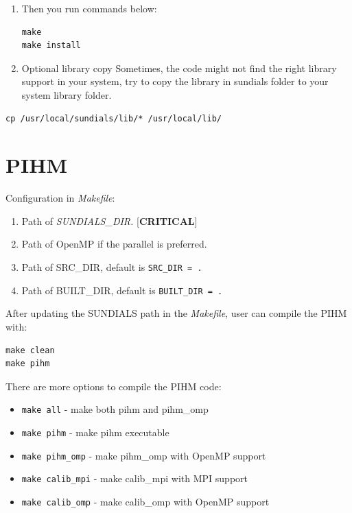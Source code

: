 \documentclass[]{scrbook}
\providecommand{\tightlist}{%
  \setlength{\itemsep}{0pt}\setlength{\parskip}{0pt}}
\begin{document}
\begin{enumerate}
\def\labelenumi{\arabic{enumi}.}
\item
  Then you run commands below:

\begin{verbatim}
make
make install 
\end{verbatim}
\item
  Optional library copy Sometimes, the code might not find the right
  library support in your system, try to copy the library in sundials
  folder to your system library folder.
\end{enumerate}

\begin{verbatim}
cp /usr/local/sundials/lib/* /usr/local/lib/
\end{verbatim}

\section{PIHM}\label{pihm}

Configuration in \emph{Makefile}:

\begin{enumerate}
\def\labelenumi{\arabic{enumi}.}
\tightlist
\item
  Path of \emph{SUNDIALS\_DIR.} {[}\textbf{CRITICAL}{]}
\item
  Path of OpenMP if the parallel is preferred.
\item
  Path of SRC\_DIR, default is \texttt{SRC\_DIR\ =\ .}
\item
  Path of BUILT\_DIR, default is \texttt{BUILT\_DIR\ =\ .}
\end{enumerate}

After updating the SUNDIALS path in the \emph{Makefile}, user can
compile the PIHM with:

\begin{verbatim}
make clean
make pihm
\end{verbatim}

There are more options to compile the PIHM code:

\begin{itemize}
\tightlist
\item
  \texttt{make\ all} - make both pihm and pihm\_omp
\item
  \texttt{make\ pihm} - make pihm executable
\item
  \texttt{make\ pihm\_omp} - make pihm\_omp with OpenMP support
\item
  \texttt{make\ calib\_mpi} - make calib\_mpi with MPI support
\item
  \texttt{make\ calib\_omp} - make calib\_omp with OpenMP support
\end{itemize}
\end{document}
